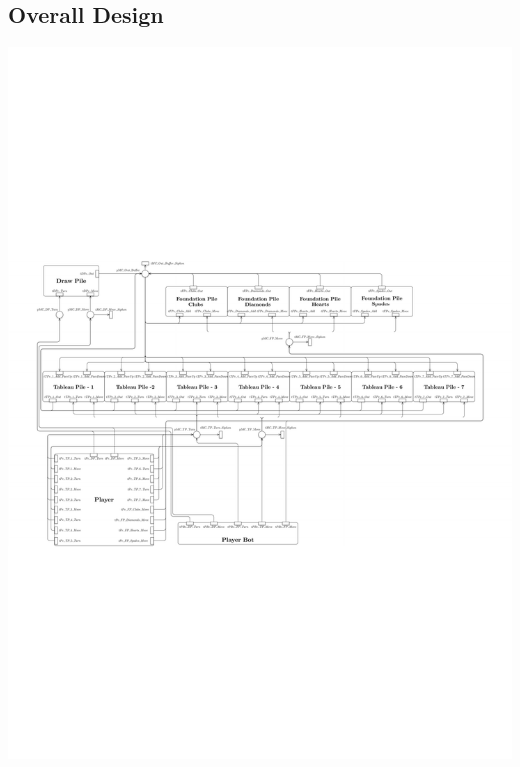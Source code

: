 \documentclass[runningheads,a4paper]{llncs}
\begin{document}
\subsection{Overall Design}
\begin{center} %
	\includegraphics[trim=180 250 160 270]{images/overallViewPdf}
\end{center}
\newline
\end{document}
